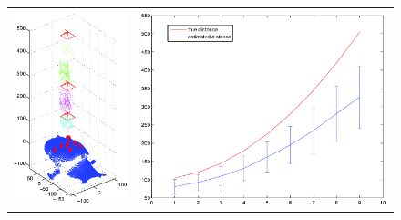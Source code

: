 \documentclass[runningheads]{llncs}
\begin{document}

\begin{figure}[ht!]
\begin{tabular}{cc}
\includegraphics[width=.5\linewidth]{resources/figures/cameraloc_frontal.png} &
\includegraphics[width=.5\linewidth]{resources/figures/errorbar_frontal.png} \\

\end{tabular}
\end{figure}
\end{document}
